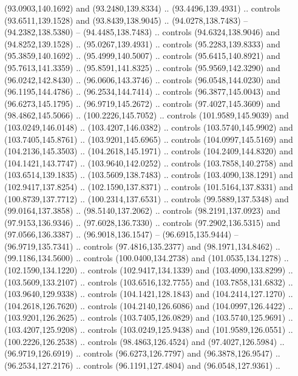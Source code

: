 {{\begin{scope}[y=-0.80pt, x=0.80pt,scale=0.3,yshift=108.8pt,xshift=-75.3pt]
        (93.0903,140.1692) and (93.2480,139.8334) .. (93.4496,139.4931) .. controls
        (93.6511,139.1528) and (93.8439,138.9045) .. (94.0278,138.7483) --
        (94.2382,138.5380) -- (94.4485,138.7483) .. controls (94.6324,138.9046) and
        (94.8252,139.1528) .. (95.0267,139.4931) .. controls (95.2283,139.8333) and
        (95.3859,140.1692) .. (95.4999,140.5007) .. controls (95.6415,140.8921) and
        (95.7613,141.3359) .. (95.8591,141.8325) .. controls (95.9569,142.3290) and
        (96.0242,142.8430) .. (96.0606,143.3746) .. controls (96.0548,144.0230) and
        (96.1195,144.4786) .. (96.2534,144.7414) .. controls (96.3877,145.0043) and
        (96.6273,145.1795) .. (96.9719,145.2672) .. controls (97.4027,145.3609) and
        (98.4862,145.5066) .. (100.2226,145.7052) .. controls (101.9589,145.9039) and
        (103.0249,146.0148) .. (103.4207,146.0382) .. controls (103.5740,145.9902) and
        (103.7405,145.8761) .. (103.9201,145.6965) .. controls (104.0997,145.5169) and
        (104.2136,145.3503) .. (104.2618,145.1971) .. controls (104.2409,144.8320) and
        (104.1421,143.7747) .. (103.9640,142.0252) .. controls (103.7858,140.2758) and
        (103.6514,139.1835) .. (103.5609,138.7483) .. controls (103.4090,138.1291) and
        (102.9417,137.8254) .. (102.1590,137.8371) .. controls (101.5164,137.8331) and
        (100.8739,137.7712) .. (100.2314,137.6531) .. controls (99.5889,137.5348) and
        (99.0164,137.3858) .. (98.5140,137.2062) .. controls (98.2191,137.0923) and
        (97.9153,136.9346) .. (97.6028,136.7330) .. controls (97.2902,136.5315) and
        (97.0566,136.3387) .. (96.9018,136.1547) -- (96.6915,135.9444) --
        (96.9719,135.7341) .. controls (97.4816,135.2377) and (98.1971,134.8462) ..
        (99.1186,134.5600) .. controls (100.0400,134.2738) and (101.0535,134.1278) ..
        (102.1590,134.1220) .. controls (102.9417,134.1339) and (103.4090,133.8299) ..
        (103.5609,133.2107) .. controls (103.6516,132.7755) and (103.7858,131.6832) ..
        (103.9640,129.9338) .. controls (104.1421,128.1843) and (104.2414,127.1270) ..
        (104.2618,126.7620) .. controls (104.2140,126.6086) and (104.0997,126.4422) ..
        (103.9201,126.2625) .. controls (103.7405,126.0829) and (103.5740,125.9691) ..
        (103.4207,125.9208) .. controls (103.0249,125.9438) and (101.9589,126.0551) ..
        (100.2226,126.2538) .. controls (98.4863,126.4524) and (97.4027,126.5984) ..
        (96.9719,126.6919) .. controls (96.6273,126.7797) and (96.3878,126.9547) ..
        (96.2534,127.2176) .. controls (96.1191,127.4804) and (96.0548,127.9361) ..

\end{scope}}}
